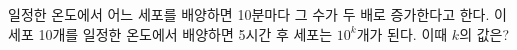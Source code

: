 일정한 온도에서 어느 세포를 배양하면 10분마다 그 수가 두 배로 증가한다고 한다. 이 세포 10개를 일정한 온도에서 배양하면 5시간 후 세포는 $10^{k}$개가 된다. 이때 $k$의 값은? 
